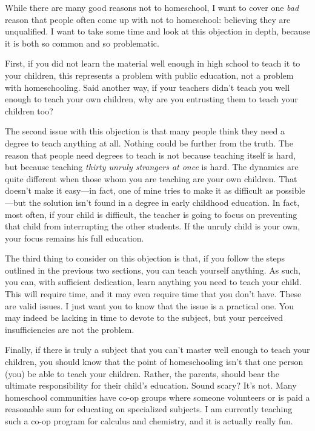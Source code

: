 While there are many good reasons not to homeschool, I want to cover one
\textit{bad} reason that people often come up with not to homeschool:
believing they are
unqualified.  I want to take some time and look at this objection in
depth, because it is both so common and so problematic. 

First, if you did not
learn the material well enough in high school to teach it to your
children, this represents a problem with public education, not a
problem with homeschooling.
Said another way, if
your teachers didn’t teach you well enough to teach your own children,
why are you entrusting them to teach your children too?  

The second issue with this objection is that many people think they need
a degree to teach anything at all. Nothing could be further from the
truth. The reason that people need degrees to teach is not because
teaching itself is hard, but because teaching \textit{thirty unruly
strangers at once} is hard. The dynamics are quite different when
those whom you are
teaching are your own children. That doesn’t make it easy—in fact, one
of mine tries to make it as difficult as possible—but the solution
isn’t found in a degree in early childhood education. In fact, most
often, if your child is difficult, the teacher is going to focus on
preventing that child from interrupting the other students. If the
unruly child is your own, your focus remains his full education.

The third thing to consider on this objection is that, if you follow the
steps outlined in the previous two sections, you can teach yourself
anything. As such, you can, with sufficient dedication, learn anything
you need to teach your child. This will require time, and it may even
require time that you don’t have. These are valid issues. I just want
you to know that the issue is a practical one. 
You may indeed be
lacking in time to devote to the subject, but your perceived
insufficiencies are not the problem. 

Finally, if there is truly a subject that you can’t master well enough
to teach your children, you should know that the point of homeschooling
isn’t that one person (you) be able to teach your children.
Rather, the parents,
should bear the ultimate responsibility for their child’s education.
Sound scary? It’s not.
Many homeschool communities have co-op groups where someone volunteers
or is paid a reasonable sum for educating on specialized subjects. I am
currently teaching such a co-op program for calculus and chemistry, and
it is actually really fun.

